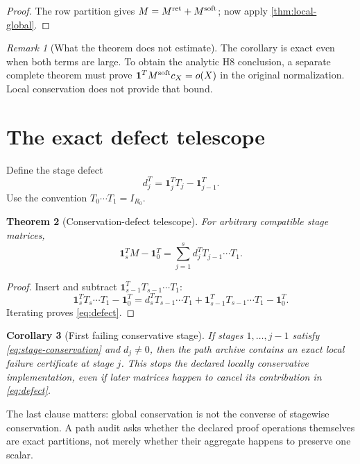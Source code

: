 \documentclass[11pt]{article}
\newtheorem{theorem}{Theorem}[section]
\newtheorem{corollary}[theorem]{Corollary}
\theoremstyle{definition}
\theoremstyle{remark}
\newtheorem{remark}[theorem]{Remark}
\newcommand{\one}{\mathbf 1}
\begin{document}
\begin{proof}
The row partition gives \(M=M^{\rm ret}+M^{\rm soft}\); now apply
\cref{thm:local-global}.
\end{proof}

\begin{remark}[What the theorem does not estimate]
The corollary is exact even when both terms are large.  To obtain the
analytic H8 conclusion, a separate complete theorem must prove
\(\one^TM^{\rm soft}c_X=o(X)\) in the original normalization.
Local conservation does not provide that bound.
\end{remark}

\section{The exact defect telescope}

Define the stage defect
\[
 d_j^T=\one_j^TT_j-\one_{j-1}^T.
\]
Use the convention \(T_0\cdots T_1=I_{R_0}\).

\begin{theorem}[Conservation-defect telescope]
\label{thm:defect}
For arbitrary compatible stage matrices,
\begin{equation}
 \boxed{
 \one_s^TM-\one_0^T
 =
 \sum_{j=1}^s
 d_j^TT_{j-1}\cdots T_1.}
 \label{eq:defect}
\end{equation}
\end{theorem}

\begin{proof}
Insert and subtract
\(\one_{s-1}^TT_{s-1}\cdots T_1\):
\[
 \one_s^TT_s\cdots T_1-\one_0^T
 =
 d_s^TT_{s-1}\cdots T_1
 +\one_{s-1}^TT_{s-1}\cdots T_1-\one_0^T.
\]
Iterating proves \eqref{eq:defect}.
\end{proof}

\begin{corollary}[First failing conservative stage]
If stages \(1,\ldots,j-1\) satisfy
\eqref{eq:stage-conservation} and \(d_j\ne0\), then the path archive
contains an exact local failure certificate at stage \(j\).  This
stops the declared locally conservative implementation, even if
later matrices happen to cancel its contribution in
\eqref{eq:defect}.
\end{corollary}

The last clause matters: global conservation is not the converse of
stagewise conservation.  A path audit asks whether the declared proof
operations themselves are exact partitions, not merely whether their
aggregate happens to preserve one scalar.
\end{document}
